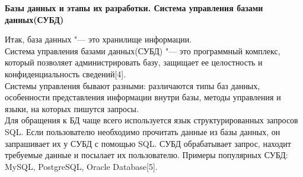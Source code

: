 \begin{flushleft}
\newpage
    \begin{center}
        \textbf{Базы данных и этапы их разработки. Система управления базами данных(СУБД)}
    \end{center}
    \vspace*{14pt}

    Итак, база данных "--- это хранилище информации.\\
    Система управления базами данных(СУБД) "--- это программный комплекс, который позволяет 
    администрировать базу, защищает ее целостность и конфиденциальность сведений[4].\\
    Системы управления бывают разными: различаются типы баз данных, особенности представления 
    информации внутри базы, методы управления и языки, на которых пишутся запросы. \\
    Для обращения к БД чаще всего используется язык структурированных запросов SQL. 
    Если пользователю необходимо прочитать данные из базы данных, он запрашивает их у
    СУБД с помощью SQL. СУБД обрабатывает запрос, находит требуемые данные и посылает их пользователю.
    Примеры популярных СУБД: MySQL, PostgreSQL, Oracle Database[5].



\end{flushleft}
